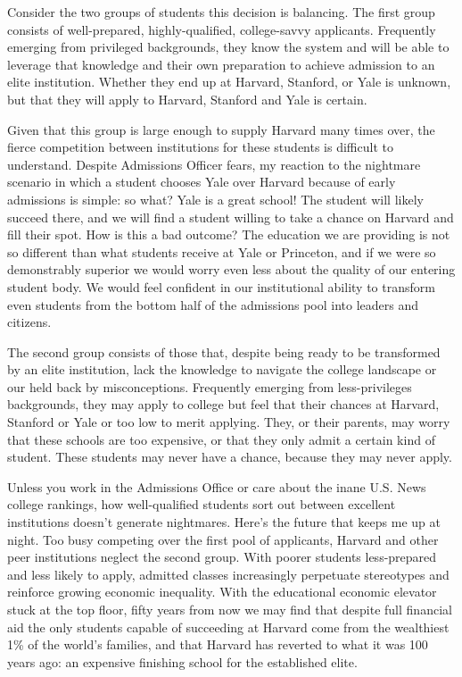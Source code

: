 Consider the two groups of students this decision is balancing. The first group
consists of well-prepared, highly-qualified, college-savvy applicants.
Frequently emerging from privileged backgrounds, they know the system and
will be able to leverage that knowledge and their own preparation to achieve
admission to an elite institution. Whether they end up at Harvard, Stanford,
or Yale is unknown, but that they will apply to Harvard, Stanford and Yale is
certain.

Given that this group is large enough to supply Harvard many times over, the
fierce competition between institutions for these students is difficult to
understand. Despite Admissions Officer fears, my reaction to the nightmare
scenario in which a student chooses Yale over Harvard because of early
admissions is simple: so what? Yale is a great school! The student will
likely succeed there, and we will find a student willing to take a chance on
Harvard and fill their spot. How is this a bad outcome? The education we are
providing is not so different than what students receive at Yale or
Princeton, and if we were so demonstrably superior we would worry even less
about the quality of our entering student body. We would feel confident in
our institutional ability to transform even students from the bottom half of
the admissions pool into leaders and citizens.

The second group consists of those that, despite being ready to be
transformed by an elite institution, lack the knowledge to navigate the
college landscape or our held back by misconceptions. Frequently emerging
from less-privileges backgrounds, they may apply to college but feel that
their chances at Harvard, Stanford or Yale or too low to merit applying.
They, or their parents, may worry that these schools are too expensive, or
that they only admit a certain kind of student. These students may never have
a chance, because they may never apply.

Unless you work in the Admissions Office or care about the inane U.S. News
college rankings, how well-qualified students sort out between excellent
institutions doesn't generate nightmares. Here's the future that keeps me up
at night. Too busy competing over the first pool of applicants, Harvard and
other peer institutions neglect the second group. With poorer students
less-prepared and less likely to apply, admitted classes increasingly
perpetuate stereotypes and reinforce growing economic inequality. With the
educational economic elevator stuck at the top floor, fifty years from now we
may find that despite full financial aid the only students capable of
succeeding at Harvard come from the wealthiest 1\% of the world's families,
and that Harvard has reverted to what it was 100 years ago: an expensive
finishing school for the established elite.

